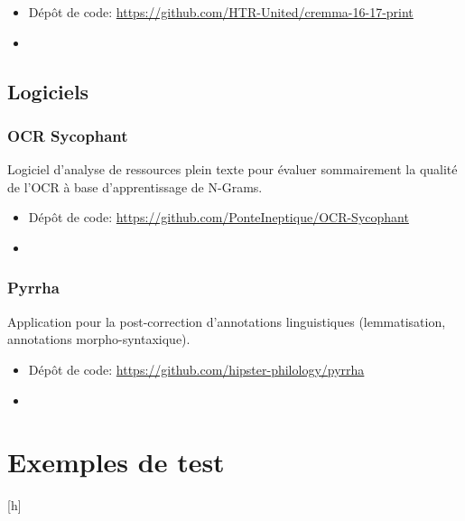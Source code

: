\begin{itemize}
    \item Dépôt de code: \url{https://github.com/HTR-United/cremma-16-17-print}
    \item \cite{Clerice_CREMMA_16_18_Prints_2021}
\end{itemize}

\subsection*{Logiciels}

\subsubsection*{OCR Sycophant}

Logiciel d'analyse de ressources plein texte pour évaluer sommairement la qualité de l'OCR à base d'apprentissage de N-Grams.

\begin{itemize}
    \item Dépôt de code: \url{https://github.com/PonteIneptique/OCR-Sycophant}
    \item \cite{Clerice_OCR_Sycophant_2021}
\end{itemize}

\subsubsection*{Pyrrha}

Application pour la post-correction d'annotations linguistiques (lemmatisation, annotations morpho-syntaxique).

\begin{itemize}
    \item Dépôt de code: \url{https://github.com/hipster-philology/pyrrha}
    \item \cite{Clerice_Pyrrha_2021}
\end{itemize}

\section*{Exemples de test}[h]

